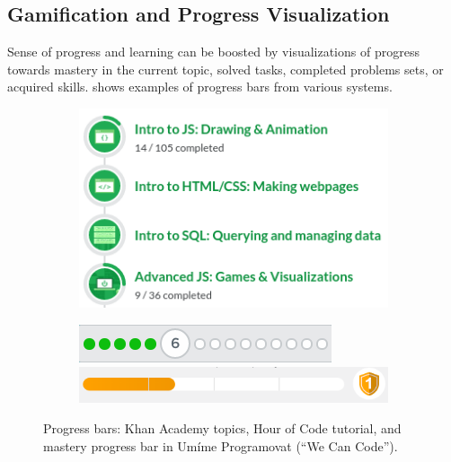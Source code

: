 \subsection{Gamification and Progress Visualization}

Sense of progress and learning can be boosted by visualizations of
progress towards mastery in the current topic, solved tasks, completed problems sets,
or acquired skills.
 shows examples of progress bars from various systems.


\begin{figure}[htb]
\centering
\begin{subfigure}{.48 \textwidth}
  \centering
  \includegraphics[width=.9\textwidth]{img/ka-skills}
\end{subfigure}
\begin{subfigure}{.48\textwidth}
  \centering
  \includegraphics[width=.9\textwidth]{img/hour-of-code-progress}
  \bigskip
  \vspace{1mm}
  \includegraphics[width=.9\textwidth]{img/umime-progressbar}
\end{subfigure}
\caption{%
  Progress bars: Khan Academy topics, Hour of Code tutorial,
  and mastery progress bar in Umíme Programovat (``We Can Code'').}
\label{fig:progress-visualization}
\end{figure}


